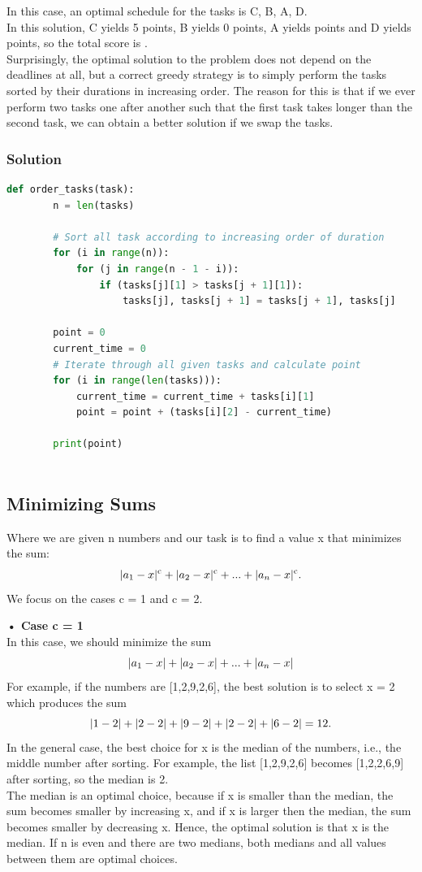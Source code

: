 \documentclass[12pt]{article}
\begin{document}
    In this case, an optimal schedule for the tasks is C, B, A, D.\\
    In this solution, C yields 5 points, B yields 0 points, A yields  points and D yields  points, so the total score is .\\
    Surprisingly, the optimal solution to the problem does not depend on the deadlines at all, but a correct greedy strategy is to simply perform the tasks sorted by their durations in increasing order. The reason for this is that if we ever perform two tasks one after another such that the first task takes longer than the second task, we can obtain a better solution if we swap the tasks.
    \newpage
    \subsubsection{Solution}
     \begin{lstlisting}[language=Python]
     def order_tasks(task):
        n = len(tasks) 
        
        # Sort all task according to increasing order of duration 
        for (i in range(n)): 
            for (j in range(n - 1 - i)): 
                if (tasks[j][1] > tasks[j + 1][1]): 
                    tasks[j], tasks[j + 1] = tasks[j + 1], tasks[j]
        
        point = 0
        current_time = 0
        # Iterate through all given tasks and calculate point
        for (i in range(len(tasks))): 
            current_time = current_time + tasks[i][1]
            point = point + (tasks[i][2] - current_time)
            
        print(point) 
        
    \end{lstlisting}
    \subsection{Minimizing Sums}
    Where we are given n numbers and our task is to find a value x that minimizes the sum:
    \[|a_1 \-- x|\textsuperscript{c} +|a_2 \-- x|\textsuperscript{c} + ... +|a_n \-- x|\textsuperscript{c}.\]
    We focus on the cases c = 1 and c = 2.
    
    \textbf{• Case c = 1}\\
    In this case, we should minimize the sum
    \[|a_1 \-- x| +|a_2 \-- x| + ... +|a_n \-- x|\]
    For example, if the numbers are [1,2,9,2,6], the best solution is to select x = 2 which produces the sum
    \[|1\--2| +|2\--2| +|9\--2| +|2\--2| +|6\--2| = 12.\]
    In the general case, the best choice for x is the median of the numbers, i.e., the middle number after sorting. For example, the list [1,2,9,2,6] becomes [1,2,2,6,9] after sorting, so the median is 2.\\
    The median is an optimal choice, because if x is smaller than the median, the sum becomes smaller by increasing x, and if x is larger then the median, the sum becomes smaller by decreasing x. Hence, the optimal solution is that x is the median. If n is even and there are two medians, both medians and all values between them are optimal choices.
    
\end{document}
